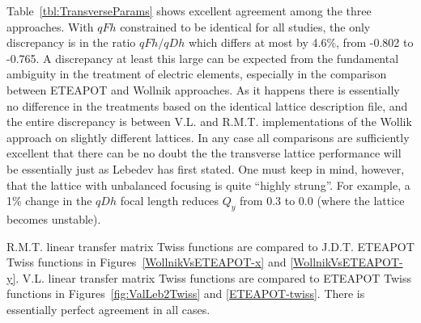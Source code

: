 \documentclass[12]{article}
\begin{document}
Table~\ref{tbl:TransverseParams} shows excellent agreement among the three approaches.
With $qFh$ constrained to be identical for all studies, the only discrepancy is
in the ratio $qFh/qDh$ which differs at most by 4.6\%, from -0.802 to -0.765.
A discrepancy at least this large can be expected from the fundamental ambiguity
in the treatment of electric elements, especially in the comparison between
ETEAPOT and Wollnik approaches.  As it happens there is essentially no
difference in the treatments based on the identical lattice description file, 
and the entire discrepancy is between V.L. and R.M.T. implementations of 
the Wollik approach on slightly different lattices. In any case all
comparisons are sufficiently excellent that there can be no doubt the the
transverse lattice performance will be essentially just as Lebedev has 
first stated. One must keep in mind, however, that the lattice with 
unbalanced focusing is quite ``highly strung''.  For example, a 1\%
change in the $qDh$ focal length reduces $Q_y$ from 0.3 to 0.0 (where
the lattice becomes unstable). 

R.M.T. linear transfer matrix Twiss functions are compared to J.D.T. ETEAPOT
Twiss functions in Figures~\ref{WollnikVsETEAPOT-x} and \ref{WollnikVsETEAPOT-y}. 
V.L. linear transfer matrix Twiss functions are compared to ETEAPOT
Twiss functions in Figures~\ref{fig:ValLeb2Twiss} and \ref{ETEAPOT-twiss}. 
There is essentially perfect agreement in all cases.
\end{document}
